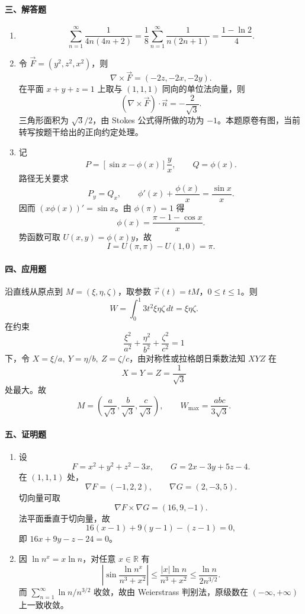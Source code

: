 \paragraph*{三、解答题}
\begin{enumerate}
  \item
  \[
    \sum_{n=1}^\infty\frac1{4n(4n+2)}
    =\frac18\sum_{n=1}^\infty\frac1{n(2n+1)}
    =\frac{1-\ln2}{4}.
  \]
  \item 令 $\vec F=(y^2,z^2,x^2)$，则
  \[
    \nabla\times\vec F=(-2z,-2x,-2y).
  \]
  在平面 $x+y+z=1$ 上取与 $(1,1,1)$ 同向的单位法向量，则
  \[
    (\nabla\times\vec F)\cdot\vec n=-\frac2{\sqrt3}.
  \]
  三角形面积为 $\sqrt3/2$，由 Stokes 公式得所做的功为 $-1$。本题原卷有图，当前转写按题干给出的正向约定处理。
  \item 记
  \[
    P=\left[\sin x-\phi(x)\right]\frac{y}{x},\qquad Q=\phi(x).
  \]
  路径无关要求
  \[
    P_y=Q_x,\qquad \phi'(x)+\frac{\phi(x)}{x}=\frac{\sin x}{x}.
  \]
  因而 $(x\phi(x))'=\sin x$。由 $\phi(\pi)=1$ 得
  \[
    \phi(x)=\frac{\pi-1-\cos x}{x}.
  \]
  势函数可取 $U(x,y)=\phi(x)y$，故
  \[
    I=U(\pi,\pi)-U(1,0)=\pi.
  \]
\end{enumerate}

\paragraph*{四、应用题}
沿直线从原点到 $M=(\xi,\eta,\zeta)$，取参数 $\vec r(t)=tM$，$0\le t\le1$。则
\[
  W=\int_0^1 3t^2\xi\eta\zeta\,dt=\xi\eta\zeta.
\]
在约束
\[
  \frac{\xi^2}{a^2}+\frac{\eta^2}{b^2}+\frac{\zeta^2}{c^2}=1
\]
下，令 $X=\xi/a,\ Y=\eta/b,\ Z=\zeta/c$，由对称性或拉格朗日乘数法知 $XYZ$ 在
\[
  X=Y=Z=\frac1{\sqrt3}
\]
处最大。故
\[
  M=\left(\frac a{\sqrt3},\frac b{\sqrt3},\frac c{\sqrt3}\right),\qquad
  W_{\max}=\frac{abc}{3\sqrt3}.
\]

\paragraph*{五、证明题}
\begin{enumerate}
  \item 设
  \[
    F=x^2+y^2+z^2-3x,\qquad G=2x-3y+5z-4.
  \]
  在 $(1,1,1)$ 处，
  \[
    \nabla F=(-1,2,2),\qquad \nabla G=(2,-3,5).
  \]
  切向量可取
  \[
    \nabla F\times\nabla G=(16,9,-1).
  \]
  法平面垂直于切向量，故
  \[
    16(x-1)+9(y-1)-(z-1)=0,
  \]
  即 $16x+9y-z-24=0$。
  \item 因 $\ln n^x=x\ln n$，对任意 $x\in\mathbb R$ 有
  \[
    \left|\sin\frac{\ln n^x}{n^3+x^2}\right|
    \le \frac{|x|\ln n}{n^3+x^2}
    \le \frac{\ln n}{2n^{3/2}}.
  \]
  而 $\sum_{n=1}^\infty \ln n/n^{3/2}$ 收敛，故由 Weierstrass 判别法，原级数在 $(-\infty,+\infty)$ 上一致收敛。
\end{enumerate}


